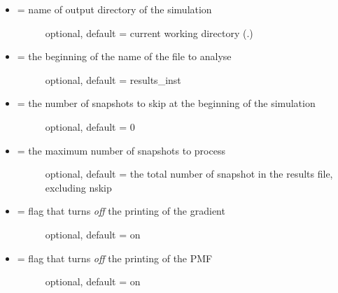 \documentclass[letterpaper,10pt,english]{manual}
\begin{document}
\begin{itemize}
\item {} \begin{description}
\item[{ = name of output directory of the simulation}] \leavevmode
optional, default = current working directory (.)

\end{description}

\item {} \begin{description}
\item[{ = the beginning of the name of the file to analyse}] \leavevmode
optional, default = results\_inst

\end{description}

\item {} \begin{description}
\item[{ = the number of snapshots to skip at the beginning of the simulation}] \leavevmode
optional, default = 0

\end{description}

\item {} \begin{description}
\item[{ = the maximum number of snapshots to process}] \leavevmode
optional, default = the total number of snapshot in the results file, excluding nskip

\end{description}

\item {} \begin{description}
\item[{  = flag that turns \emph{off} the printing of the gradient}] \leavevmode
optional, default = on

\end{description}

\item {} \begin{description}
\item[{  = flag that turns \emph{off} the printing of the PMF}] \leavevmode
optional, default = on


\end{description}
\end{itemize}
\end{document}
